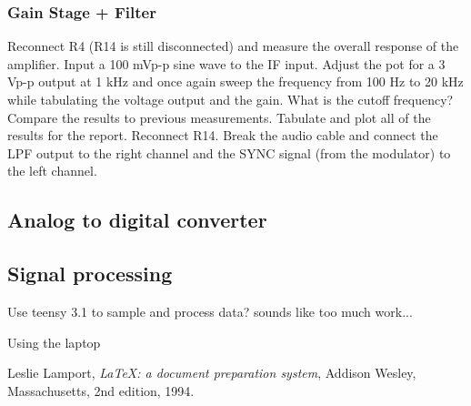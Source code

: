 \documentclass[letterpaper, 11pt]{article}
\begin{document}
\subsubsection{Gain Stage + Filter}
Reconnect R4 (R14 is still disconnected) and measure the overall response of the amplifier. Input a 100 mVp-p sine wave to the IF input. Adjust the pot for a 3 Vp-p output at 1 kHz and once again sweep the frequency from 100 Hz to 20 kHz while tabulating the voltage output and the gain. What is the cutoff frequency? Compare the results to previous measurements. Tabulate and plot all of the results for the report.
Reconnect R14. Break the audio cable and connect the LPF output to the right channel and the SYNC signal (from the modulator) to the left channel. 


\subsection{Analog to digital converter}

\subsection{Signal processing}

Use teensy 3.1 to sample and process data? sounds like too much work...

Using the laptop



\begin{thebibliography}{9}

  Leslie Lamport,
  \emph{\LaTeX: a document preparation system},
  Addison Wesley, Massachusetts,
  2nd edition,
  1994.

\end{thebibliography}
\end{document}
